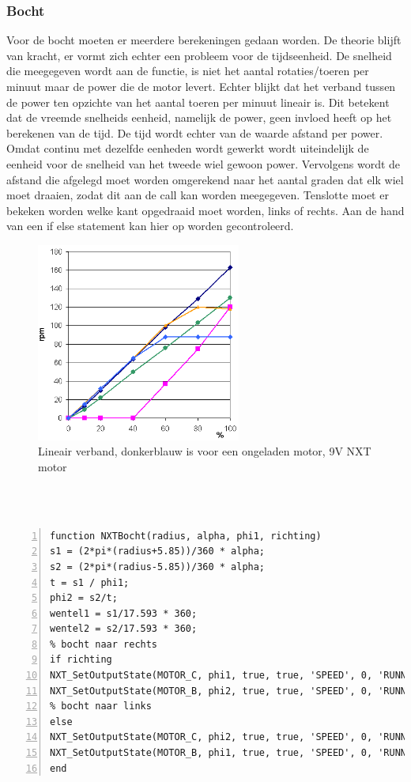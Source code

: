 \documentclass[a4paper]{article}
\begin{document}
\subsubsection{Bocht}
Voor de bocht moeten er meerdere berekeningen gedaan worden. De theorie blijft van kracht, er vormt zich echter een probleem voor de tijdseenheid. De snelheid die meegegeven wordt aan de functie, is niet het aantal rotaties/toeren per minuut maar de power die de motor levert. Echter blijkt dat het verband tussen de power ten opzichte van het aantal toeren per minuut lineair is. Dit betekent dat de vreemde snelheids eenheid, namelijk de power, geen invloed heeft op het berekenen van de tijd. De tijd wordt echter van de waarde afstand per power. Omdat continu met dezelfde eenheden wordt gewerkt wordt uiteindelijk de eenheid voor de snelheid van het tweede wiel gewoon power. Vervolgens wordt de afstand die afgelegd moet worden omgerekend naar het aantal graden dat elk wiel moet draaien, zodat dit aan de call kan worden meegegeven. Tenslotte moet er bekeken worden welke kant opgedraaid moet worden, links of rechts. Aan de hand van een if else statement kan hier op worden gecontroleerd.
\begin{figure}[h]
	\centering
	\includegraphics[width=0.6\textwidth]{imgs/lineair.png}
	\caption{Lineair verband, donkerblauw is voor een ongeladen motor, 9V NXT motor\protect\footnotemark}
	\label{fig:lineairverband}
\end{figure}
\\\\
\begin{lstlisting}[caption=Bocht, label=lst:bocht, numbers=left]
function NXTBocht(radius, alpha, phi1, richting)
s1 = (2*pi*(radius+5.85))/360 * alpha;
s2 = (2*pi*(radius-5.85))/360 * alpha;
t = s1 / phi1;
phi2 = s2/t;
wentel1 = s1/17.593 * 360;
wentel2 = s2/17.593 * 360;
% bocht naar rechts
if richting
NXT_SetOutputState(MOTOR_C, phi1, true, true, 'SPEED', 0, 'RUNNING', wentel1, 'dontreply');
NXT_SetOutputState(MOTOR_B, phi2, true, true, 'SPEED', 0, 'RUNNING', wentel2, 'dontreply');
% bocht naar links
else
NXT_SetOutputState(MOTOR_C, phi2, true, true, 'SPEED', 0, 'RUNNING', wentel2, 'dontreply');
NXT_SetOutputState(MOTOR_B, phi1, true, true, 'SPEED', 0, 'RUNNING', wentel1, 'dontreply');
end
\end{lstlisting}
\end{document}
